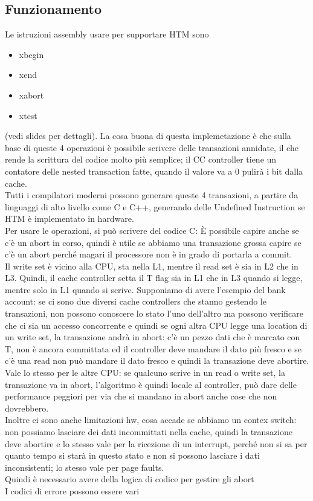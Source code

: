 \documentclass[12pt, oneside]{extbook} %
\begin{document}
\subsection{Funzionamento}
Le istruzioni assembly usare per supportare HTM sono
\begin{itemize}
\item \textsf{xbegin}
\item \textsf{xend}
\item \textsf{xabort}
\item \textsf{xtest}
\end{itemize}
(vedi slides per dettagli). La cosa buona di questa implemetazione è che sulla base di queste 4 operazioni è possibile scrivere delle transazioni annidate, il che rende la scrittura del codice molto più semplice; il CC controller tiene un contatore delle nested transaction fatte, quando il valore va a 0 pulirà i bit dalla cache.\\ Tutti i compilatori moderni possono generare queste 4 transazioni, a partire da linguaggi di alto livello come C e C++, generando delle Undefined Instruction se HTM è implementato in hardware.\\ Per usare le operazioni, si può scrivere del codice C:
È possibile capire anche se c'è un abort in corso, quindi è utile se abbiamo una transazione grossa capire se c'è un abort perché magari il processore non è in grado di portarla a commit.\\ Il write set è vicino alla CPU, sta nella L1, mentre il read set è sia in L2 che in L3. Quindi, il cache controller setta il T flag sia in L1 che in L3 quando si legge, mentre solo in L1 quando si scrive. Supponiamo di avere l'esempio del bank account: se ci sono due diversi cache controllers che stanno gestendo le transazioni, non possono conoscere lo stato l'uno dell'altro ma possono verificare che ci sia un accesso concorrente e quindi se ogni altra CPU legge una location di un write set, la transazione andrà in abort: c'è un pezzo dati che è marcato con T, non è ancora committata ed il controller deve mandare il dato più fresco e se c'è una read non può mandare il dato fresco e quindi la transazione deve abortire.\\ Vale lo stesso per le altre CPU: se qualcuno scrive in un read o write set, la transazione va in abort, l'algoritmo è quindi locale al controller, può dare delle performance peggiori per via che si mandano in abort anche cose che non dovrebbero. \\Inoltre ci sono anche limitazioni hw, cosa accade se abbiamo un contex switch: non possiamo lasciare dei dati incommittati nella cache, quindi la transazione deve abortire e lo stesso vale per la ricezione di un interrupt, perché non si sa per quanto tempo si starà in questo stato e non si possono lasciare i dati inconsistenti; lo stesso vale per page faults.\\ Quindi è necessario avere della logica di codice per gestire gli abort\\ I codici di errore possono essere vari
\end{document}
